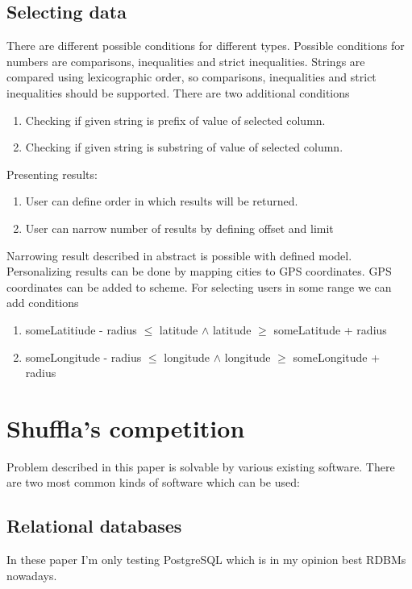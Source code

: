 \documentclass[10pt,a4paper]{article}
\begin{document}
\subsection{Selecting data}
There are different possible conditions for different types. Possible conditions for numbers are comparisons, inequalities and strict inequalities. Strings are compared using lexicographic order, so comparisons, inequalities and strict inequalities should be supported. There are two additional conditions
\begin{enumerate}
\item Checking if given string is prefix of value of selected column. 
\item Checking if given string is substring of value of selected column. 
\end{enumerate}
Presenting results:
\begin{enumerate}
\item User can define order in which results will be returned.
\item User can narrow number of results by defining offset and 
limit
\end{enumerate}

Narrowing result described in abstract is possible with defined model. Personalizing results can be done by mapping cities to GPS coordinates. GPS coordinates can be added to scheme. For selecting users in some range we can add conditions   
\begin{enumerate}
\item{someLatitiude - radius $\leq$ latitude $\wedge$ latitude $\geq$ someLatitude + radius}
\item{someLongitude - radius $\leq$ longitude $\wedge$ longitude $\geq$ someLongitude + radius}
\end{enumerate}

\section{Shuffla's competition}
Problem described in this paper is solvable by various existing software. There are two most common kinds of software which can be used:

\subsection{Relational databases}
In these paper I'm only testing PostgreSQL which is in my opinion best RDBMs nowadays.
\end{document}
